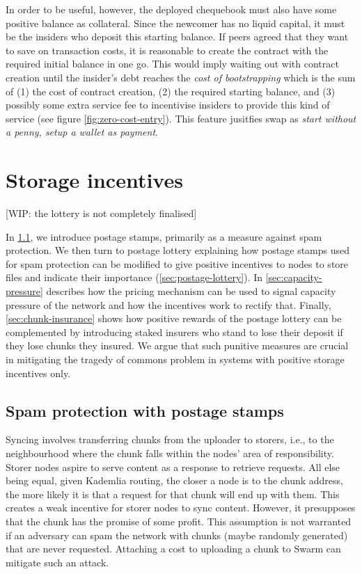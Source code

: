 In order to be useful, however, the deployed chequebook must also have some positive balance as collateral. Since the newcomer has no liquid capital, it must be the insiders who deposit this starting balance. If peers agreed that they want to save on transaction costs, it is reasonable to create the contract with the required initial balance in one go. This would imply waiting out with contract creation until the insider's debt reaches the \emph{cost of bootstrapping} which is the sum of (1) the cost of contract creation, (2) the required starting balance, and (3) possibly some extra service fee to incentivise insiders to provide this kind of service (see figure \ref{fig:zero-cost-entry}). This feature jusitfies swap as \emph{start without a penny, setup a wallet as payment}.

\section{Storage incentives}\label{sec:storage-incentives}

[WIP: the lottery is not completely finalised]

In \ref{sec:postage-stamps}, we introduce postage stamps, primarily as a measure against spam protection.  
We then turn to postage lottery explaining how postage stamps used for spam protection can be modified to give positive incentives to nodes to store files and indicate their importance (\ref{sec:postage-lottery}). In \ref{sec:capacity-pressure} describes how the pricing mechanism can be used to signal capacity pressure of the network and how the incentives work to rectify that. Finally, \ref{sec:chunk-insurance} shows how positive rewards of the postage lottery can be complemented by introducing staked insurers who stand to lose their deposit if they lose chunks they insured. We argue that such punitive measures are crucial in mitigating the tragedy of commons problem in systems with positive storage incentives only. 

\subsection{Spam protection with postage stamps}\label{sec:postage-stamps}

Syncing involves transferring chunks from the uploader to storers, i.e., to the neighbourhood where the chunk falls within the nodes' area of responsibility. Storer nodes aspire to serve content as a response to retrieve requests. All else being equal, given Kademlia routing, the closer a node is to the chunk address, the more likely it is that a request for that chunk will end up with them. This creates a weak incentive for storer nodes to sync content. However, it presupposes that the chunk has the promise of some profit. This assumption is not warranted if an adversary can spam the network with chunks (maybe randomly generated) that are never requested. Attaching a cost to uploading a chunk to Swarm can mitigate such an attack. 


